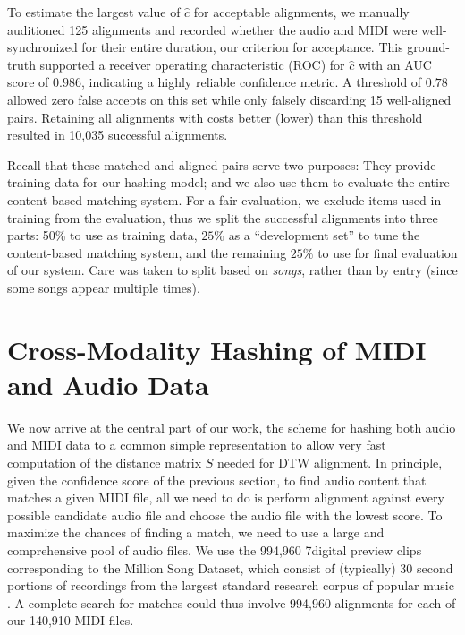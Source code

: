 \documentclass{article}
\begin{document}
To estimate the largest value of $\hat{c}$ for acceptable alignments, we manually auditioned 125 alignments and recorded whether the audio and MIDI were well-synchronized for their entire duration, our criterion for acceptance.
This ground-truth supported a receiver operating characteristic (ROC) for $\hat{c}$ with an AUC score of $0.986$, indicating a highly reliable confidence metric.
A threshold of $0.78$ allowed zero false accepts on this set while only falsely discarding 15 well-aligned pairs.
Retaining all alignments with costs better (lower) than this threshold resulted in 10,035 successful alignments.

Recall that these matched and aligned pairs serve two purposes: They provide training data for our hashing model; and we also use them to evaluate the entire content-based matching system.
For a fair evaluation, we exclude items used in training from the evaluation, thus we split the successful alignments into three parts: 50\% to use as training data, $25\%$ as a ``development set'' to tune the content-based matching system, and the remaining $25\%$ to use for final evaluation of our system.
Care was taken to split based on \textit{songs}, rather than by entry (since some songs appear multiple times).

\section{Cross-Modality Hashing of MIDI and Audio Data}
\label{sec:hashing}

We now arrive at the central part of our work, the scheme for hashing both audio and MIDI data to a  common simple representation to allow very fast computation of the distance matrix $S$ needed for DTW alignment.
In principle, given the confidence score of the previous section, to find audio content that matches a given MIDI file, all we need to do is perform alignment against every possible candidate audio file and choose the audio file with the lowest score.
To maximize the chances of finding a match, we need to use a large and comprehensive pool of audio files.
We use the 994,960 7digital preview clips corresponding to the Million Song Dataset, which consist of (typically) 30 second portions of recordings from the largest standard research corpus of popular music \cite{schindler2012facilitating}.
A complete search for matches could thus involve 994,960 alignments for each of our 140,910 MIDI files.
\end{document}
